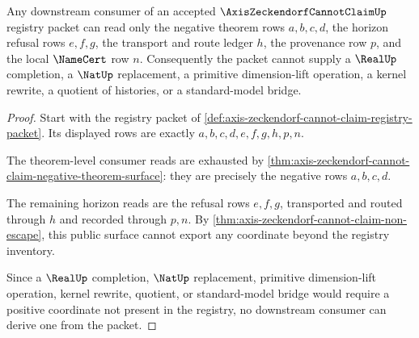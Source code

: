 \begin{theorem}
\label{thm:axis-zeckendorf-cannot-claim-consumer-horizon-exhaustion}
Any downstream consumer of an accepted $\AxisZeckendorfCannotClaimUp$ registry packet can read only the negative theorem rows $a,b,c,d$, the horizon refusal rows $e,f,g$, the transport and route ledger $h$, the provenance row $p$, and the local $\NameCert$ row $n$. Consequently the packet cannot supply a $\RealUp$ completion, a $\NatUp$ replacement, a primitive dimension-lift operation, a kernel rewrite, a quotient of histories, or a standard-model bridge.
\end{theorem}
\begin{proof}
Start with the registry packet of \autoref{def:axis-zeckendorf-cannot-claim-registry-packet}. Its displayed rows are exactly $a,b,c,d,e,f,g,h,p,n$.

The theorem-level consumer reads are exhausted by \autoref{thm:axis-zeckendorf-cannot-claim-negative-theorem-surface}: they are precisely the negative rows $a,b,c,d$.

The remaining horizon reads are the refusal rows $e,f,g$, transported and routed through $h$ and recorded through $p,n$. By \autoref{thm:axis-zeckendorf-cannot-claim-non-escape}, this public surface cannot export any coordinate beyond the registry inventory.

Since a $\RealUp$ completion, $\NatUp$ replacement, primitive dimension-lift operation, kernel rewrite, quotient, or standard-model bridge would require a positive coordinate not present in the registry, no downstream consumer can derive one from the packet.
\end{proof}


